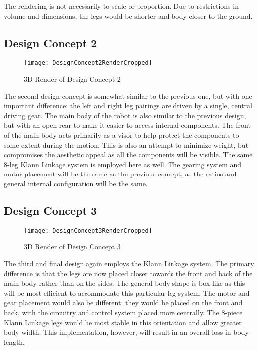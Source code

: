     The rendering is not necessarily to scale or proportion.  Due to restrictions in volume and dimensions, the legs would be shorter and body closer to the ground.

  \subsection{Design Concept 2}
  \label{sub:Design Concept 2}
    \begin{figure}[H]
      \begin{center}
        \texttt{[image: DesignConcept2RenderCropped]}
        \caption{3D Render of Design Concept 2}
        \label{fig:3dConcept2}
      \end{center}
    \end{figure}

    The second design concept is somewhat similar to the previous one, but with one important difference: the left and right leg pairings are driven by a single, central driving gear. The main body of the robot is also similar to the previous design, but with an open rear to make it easier to access internal components. The front of the main body acts primarily as a visor to help protect the components to some extent during the motion. This is also an attempt to minimize weight, but compromises the aesthetic appeal as all the components will be visible. The same 8-leg Klann Linkage system is employed here as well. The gearing system and motor placement will be the same as the previous concept, as the ratios and general internal configuration will be the same.

  \subsection{Design Concept 3}
  \label{sub:Design Concept 3}
    \begin{figure}[H]
      \begin{center}
        \texttt{[image: DesignConcept3RenderCropped]}
        \caption{3D Render of Design Concept 3}
        \label{fig:3dConcept3}
      \end{center}
    \end{figure}

    The third and final design again employs the Klann Linkage system. The primary difference is that the legs are now placed closer towards the front and back of the main body rather than on the sides. The general body shape is box-like as this will be most efficient to accommodate this particular leg system. The motor and gear placement would also be different: they would be placed on the front and back, with the circuitry and control system placed more centrally. The 8-piece Klann Linkage legs would be most stable in this orientation and allow greater body width. This implementation, however, will result in an overall loss in body length.

